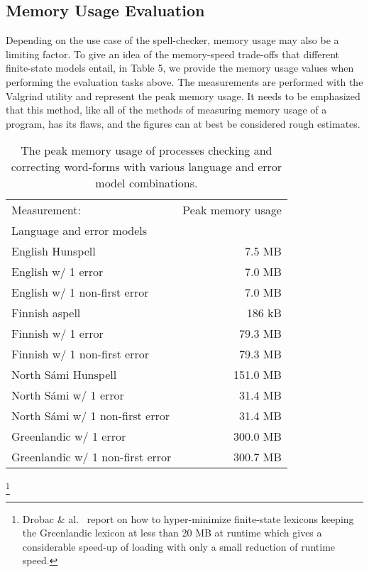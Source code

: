 \documentclass[postprint]{flammie}
\begin{document}
\subsection{Memory Usage Evaluation}

Depending on the use case of the spell-checker, memory usage may also be a
limiting factor. To give an idea of the memory-speed trade-offs that different
finite-state models entail, in Table 5, we provide the memory usage values
when performing the evaluation tasks above. The measurements are performed
with the Valgrind utility and represent the peak memory usage. It needs to be
emphasized that this method, like all of the methods of measuring memory usage
of a program, has its flaws, and the figures can at best be considered rough
estimates.

\begin{table}
    \caption{The peak memory usage of processes checking and correcting word-forms with various language and error model combinations.}
    \begin{tabular}{lr}
Measurement: & Peak memory usage \\
Language and error models & \\
        English Hunspell & 7.5 MB \\
        English w/ 1 error & 7.0 MB \\
        English w/ 1 non-first error & 7.0 MB \\
        Finnish aspell & 186 kB \\
        Finnish w/ 1 error & 79.3 MB \\
        Finnish w/ 1 non-first error & 79.3 MB \\
        North Sámi Hunspell & 151.0 MB \\
        North Sámi w/ 1 error & 31.4 MB \\
        North Sámi w/ 1 non-first error & 31.4 MB \\
        Greenlandic w/ 1 error & 300.0 MB \\
        Greenlandic w/ 1 non-first error & 300.7 MB \\
    \end{tabular}
\end{table}

\footnote{Drobac \& al.~\cite{drobac2014heuristic} report on how to hyper-minimize finite-state lexicons keeping the Greenlandic lexicon at less than 20 MB at runtime which gives a considerable speed-up of loading
with only a small reduction of runtime speed.}
\end{document}
